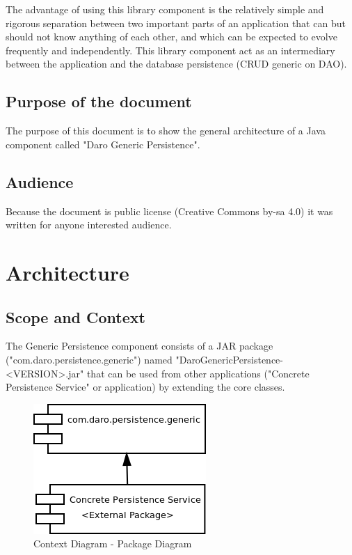 \documentclass[a4paper,11pt]{book}
\begin{document}
The advantage of using this library component is the relatively simple and rigorous separation between two important parts of an application that can but should not know anything of each other, and which can be expected to evolve frequently and independently. This library component act as an intermediary between the application and the database persistence (CRUD generic on DAO).

\section{Purpose of the document}
The purpose of this document is to show the general architecture of a Java component called "Daro Generic Persistence".

\section{Audience}
Because the document is public license (Creative Commons by-sa 4.0) it was written for anyone interested audience.

\chapter{Architecture}

\section{Scope and Context}
The Generic Persistence component consists of a JAR package ("com.daro.persistence.generic") named "DaroGenericPersistence-<VERSION>.jar" that can be used from other applications ("Concrete Persistence Service" or application) by extending the core classes.

\begin{figure}[h] %
  \includegraphics{generic_persistence_package_diagram}
  \caption{Context Diagram - Package Diagram}
  \centering
  \label{fig:context} %
\end{figure}
\end{document}
